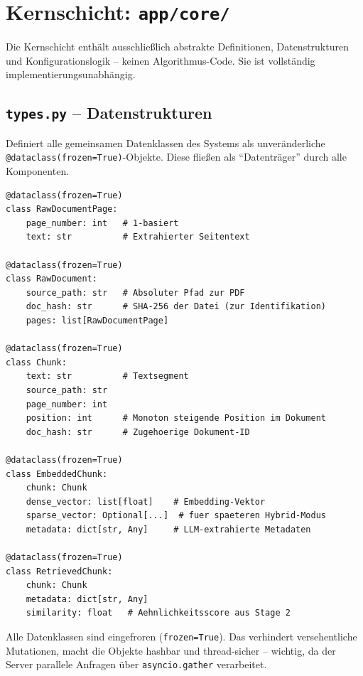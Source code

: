 \documentclass[12pt, a4paper]{article}
\begin{document}
\newpage
\section{Kernschicht: \texttt{app/core/}}

Die Kernschicht enthält ausschließlich abstrakte Definitionen, Datenstrukturen und
Konfigurationslogik -- keinen Algorithmus-Code. Sie ist vollständig implementierungsunabhängig.

\subsection{\texttt{types.py} -- Datenstrukturen}

Definiert alle gemeinsamen Datenklassen des Systems als unveränderliche
\texttt{@dataclass(frozen=True)}-Objekte. Diese fließen als ``Datenträger'' durch
alle Komponenten.

\begin{lstlisting}[style=pythonstyle, caption={Kerntypen des Systems (types.py)}]
@dataclass(frozen=True)
class RawDocumentPage:
    page_number: int   # 1-basiert
    text: str          # Extrahierter Seitentext

@dataclass(frozen=True)
class RawDocument:
    source_path: str   # Absoluter Pfad zur PDF
    doc_hash: str      # SHA-256 der Datei (zur Identifikation)
    pages: list[RawDocumentPage]

@dataclass(frozen=True)
class Chunk:
    text: str          # Textsegment
    source_path: str
    page_number: int
    position: int      # Monoton steigende Position im Dokument
    doc_hash: str      # Zugehoerige Dokument-ID

@dataclass(frozen=True)
class EmbeddedChunk:
    chunk: Chunk
    dense_vector: list[float]    # Embedding-Vektor
    sparse_vector: Optional[...]  # fuer spaeteren Hybrid-Modus
    metadata: dict[str, Any]     # LLM-extrahierte Metadaten

@dataclass(frozen=True)
class RetrievedChunk:
    chunk: Chunk
    metadata: dict[str, Any]
    similarity: float   # Aehnlichkeitsscore aus Stage 2
\end{lstlisting}

\begin{infobox}[Designentscheidung: frozen=True]
Alle Datenklassen sind eingefroren (\texttt{frozen=True}). Das verhindert versehentliche
Mutationen, macht die Objekte hashbar und thread-sicher -- wichtig, da der Server
parallele Anfragen über \texttt{asyncio.gather} verarbeitet.
\end{infobox}
\end{document}
